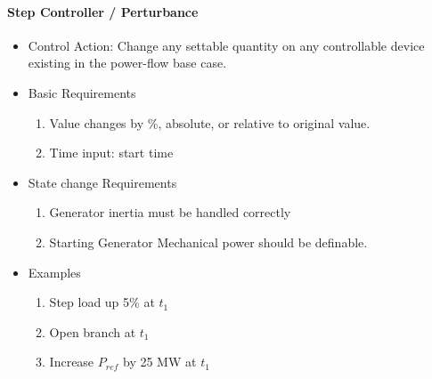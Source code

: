 \documentclass[12pt]{article}
\newcommand{\q}{(\textit{\textbf{?}})}
\begin{document}
\begin{multicols*}{2}
\raggedright
\noindent
\paragraph{Step Controller / Perturbance}
\begin{itemize}
	\item Control Action: Change any settable quantity on any controllable device existing in the power-flow base case.
	\item Basic Requirements
	\begin{enumerate}
		\item Value changes by \%, absolute, or relative to original value.
		\item Time input: start time
	\end{enumerate}
	\item State change Requirements
	\begin{enumerate}
		\item Generator inertia must be handled correctly
		\item Starting Generator Mechanical power should be definable.
	\end{enumerate}
	\item Examples
	\begin{enumerate}
		\item Step load up 5\% at $t_1$
		\item Open branch at $t_1$
		\item Increase $P_{ref}$ by 25 MW at $t_1$
	\end{enumerate}
\end{itemize}


\end{multicols*}
\end{document}
